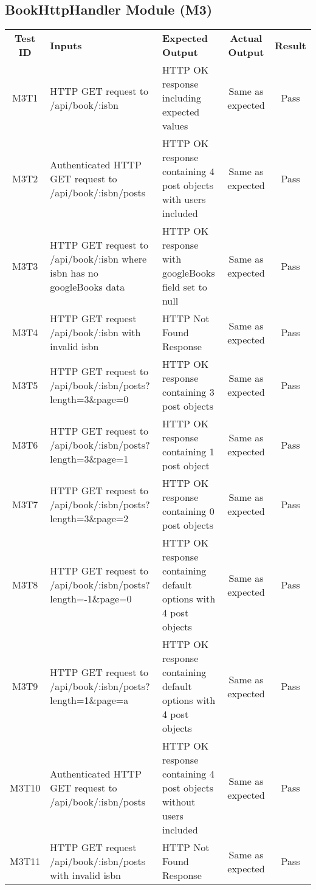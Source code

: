 \documentclass[fullpage]{article}
\begin{document}
\subsection{BookHttpHandler Module (M3)}
\begin{table}[H]
\flushleft
\begin{tabular}{|c|p{5.6cm}|p{3.6cm}|c|c|}
\hline
 \rowcolor{lightgray} 
\textbf{Test ID} &\textbf{Inputs} &\textbf{Expected Output} &\textbf{Actual Output} &\textbf{Result}\\
M3T1 & HTTP GET request to /api/book/:isbn & HTTP OK response including expected values & Same as expected & Pass\\
\hline
M3T2 & Authenticated HTTP GET request to /api/book/:isbn/posts & HTTP OK response containing 4 post objects with users included & Same as expected & Pass\\
\hline
M3T3 & HTTP GET request to /api/book/:isbn where isbn has no googleBooks data & HTTP OK response with googleBooks field set to null & Same as expected & Pass\\
\hline
M3T4 & HTTP GET request /api/book/:isbn with invalid isbn & HTTP Not Found Response  & Same as expected & Pass\\
\hline
M3T5 & HTTP GET request to /api/book/:isbn/posts?length=3\&page=0 &  HTTP OK response containing 3 post objects & Same as expected & Pass\\
\hline
M3T6 & HTTP GET request to /api/book/:isbn/posts?length=3\&page=1 &  HTTP OK response containing 1 post object & Same as expected & Pass\\
\hline
M3T7 & HTTP GET request to /api/book/:isbn/posts?length=3\&page=2 &  HTTP OK response containing 0 post objects & Same as expected & Pass\\
\hline
M3T8 & HTTP GET request to /api/book/:isbn/posts?length=-1\&page=0 &  HTTP OK response containing default options with 4 post objects & Same as expected & Pass\\
\hline
M3T9 & HTTP GET request to /api/book/:isbn/posts?length=1\&page=a &  HTTP OK response containing default options with 4 post objects & Same as expected & Pass\\
\hline
M3T10 & Authenticated HTTP GET request to /api/book/:isbn/posts & HTTP OK response containing 4 post objects without users included & Same as expected & Pass\\
\hline
M3T11 & HTTP GET request /api/book/:isbn/posts with invalid isbn & HTTP Not Found Response  & Same as expected & Pass\\
\hline


\end{tabular}
\end{table}
\end{document}
